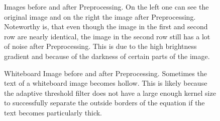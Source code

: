 \documentclass[12pt]{article}
\begin{document}
\begin{figure}[htp]
		\quad
		
		\caption{Images before and after Preprocessing.
		On the left one can see the original image and on the right the image after Preprocessing.
		Noteworthy is, that even though the image in the first and second row are nearly identical, the image in the second row still has a lot of noise after Preprocessing.
		This is due to the high brightness gradient and because of the darkness of certain parts of the image.}
		\label{fig:PreprocessingExamples}
	\end{figure}
	
		\begin{figure}[htp]
		\centering
		\quad
		
		
		\caption{Whiteboard Image before and after Preprocessing.
		Sometimes the text of a whiteboard image becomes hollow.
		This is likely because the adaptive threshold filter does not have a large enough kernel size to successfully separate the outside borders of the equation if the text becomes particularly thick.}
		\label{fig:HollowWhiteboardImage}
	\end{figure}
	
\end{document}
